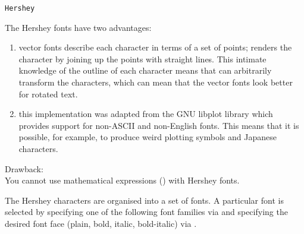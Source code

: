 %
\begin{Usage}
\begin{verbatim}
Hershey
\end{verbatim}
\end{Usage}
%
\begin{Details}\relax
The Hershey fonts have two advantages:\\{}
\begin{enumerate}

\item vector fonts describe each
character in terms of a set of points;  \R{} renders the character by
joining up the points with straight lines.  This intimate knowledge of
the outline of each character means that \R{} can arbitrarily transform
the characters, which can mean that the vector fonts look better
for rotated text.
\item this implementation was adapted from the GNU libplot library
which provides support for non-ASCII and non-English fonts.  This means
that it is possible, for example, to produce weird plotting symbols and
Japanese characters.

\end{enumerate}

Drawback:\\{}
You cannot use mathematical expressions () with
Hershey fonts.

The Hershey characters are organised into a set of fonts.  A
particular font is selected by specifying one of the following
font families via  and specifying the desired font
face (plain, bold, italic, bold-italic) via .





\end{Details}
